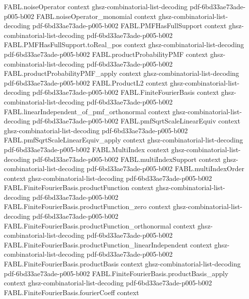 \begin{theorem}
\proofstep
  {FABL.noiseOperator}
  {context}
  {ghsz-combinatorial-list-decoding}
  {pdf-6bd33ae73ade-p005-b002}
\proofstep
  {FABL.noiseOperator_monomial}
  {context}
  {ghsz-combinatorial-list-decoding}
  {pdf-6bd33ae73ade-p005-b002}
\proofstep
  {FABL.PMFHasFullSupport}
  {context}
  {ghsz-combinatorial-list-decoding}
  {pdf-6bd33ae73ade-p005-b002}
\proofstep
  {FABL.PMFHasFullSupport.toReal_pos}
  {context}
  {ghsz-combinatorial-list-decoding}
  {pdf-6bd33ae73ade-p005-b002}
\proofstep
  {FABL.productProbabilityPMF}
  {context}
  {ghsz-combinatorial-list-decoding}
  {pdf-6bd33ae73ade-p005-b002}
\proofstep
  {FABL.productProbabilityPMF_apply}
  {context}
  {ghsz-combinatorial-list-decoding}
  {pdf-6bd33ae73ade-p005-b002}
\proofstep
  {FABL.ProductL2}
  {context}
  {ghsz-combinatorial-list-decoding}
  {pdf-6bd33ae73ade-p005-b002}
\proofstep
  {FABL.FiniteFourierBasis}
  {context}
  {ghsz-combinatorial-list-decoding}
  {pdf-6bd33ae73ade-p005-b002}
\proofstep
  {FABL.linearIndependent_of_pmf_orthonormal}
  {context}
  {ghsz-combinatorial-list-decoding}
  {pdf-6bd33ae73ade-p005-b002}
\proofstep
  {FABL.pmfSqrtScaleLinearEquiv}
  {context}
  {ghsz-combinatorial-list-decoding}
  {pdf-6bd33ae73ade-p005-b002}
\proofstep
  {FABL.pmfSqrtScaleLinearEquiv_apply}
  {context}
  {ghsz-combinatorial-list-decoding}
  {pdf-6bd33ae73ade-p005-b002}
\proofstep
  {FABL.MultiIndex}
  {context}
  {ghsz-combinatorial-list-decoding}
  {pdf-6bd33ae73ade-p005-b002}
\proofstep
  {FABL.multiIndexSupport}
  {context}
  {ghsz-combinatorial-list-decoding}
  {pdf-6bd33ae73ade-p005-b002}
\proofstep
  {FABL.multiIndexOrder}
  {context}
  {ghsz-combinatorial-list-decoding}
  {pdf-6bd33ae73ade-p005-b002}
\proofstep
  {FABL.FiniteFourierBasis.productFunction}
  {context}
  {ghsz-combinatorial-list-decoding}
  {pdf-6bd33ae73ade-p005-b002}
\proofstep
  {FABL.FiniteFourierBasis.productFunction_zero}
  {context}
  {ghsz-combinatorial-list-decoding}
  {pdf-6bd33ae73ade-p005-b002}
\proofstep
  {FABL.FiniteFourierBasis.productFunction_orthonormal}
  {context}
  {ghsz-combinatorial-list-decoding}
  {pdf-6bd33ae73ade-p005-b002}
\proofstep
  {FABL.FiniteFourierBasis.productFunction_linearIndependent}
  {context}
  {ghsz-combinatorial-list-decoding}
  {pdf-6bd33ae73ade-p005-b002}
\proofstep
  {FABL.FiniteFourierBasis.productBasis}
  {context}
  {ghsz-combinatorial-list-decoding}
  {pdf-6bd33ae73ade-p005-b002}
\proofstep
  {FABL.FiniteFourierBasis.productBasis_apply}
  {context}
  {ghsz-combinatorial-list-decoding}
  {pdf-6bd33ae73ade-p005-b002}
\proofstep
  {FABL.FiniteFourierBasis.fourierCoeff}
  {context}

\end{theorem}
